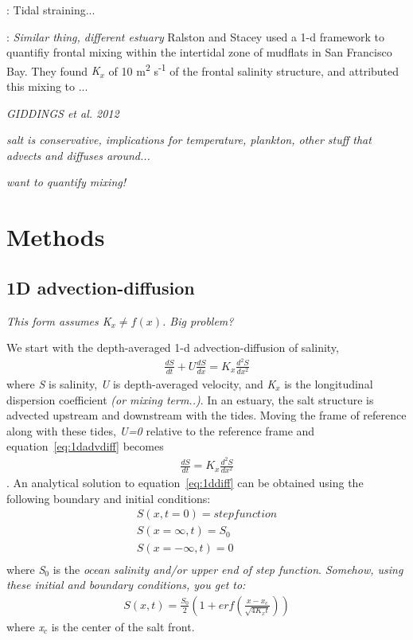 \parencite{Simpson:1990aa}: Tidal straining... 




\parencite{Ralston:2005aa}: \emph{Similar thing, different estuary}
Ralston and Stacey \cite{Ralston:2005aa} used a 1-d framework to quantifiy frontal mixing within the intertidal zone of mudflats in San Francisco Bay. They found \emph{K$_x$} of 10 m\textsuperscript{2} s\textsuperscript{-1} of the frontal salinity structure, and attributed this mixing to ...



\emph{GIDDINGS et al. 2012} 


\emph{salt is conservative, implications for temperature, plankton, other stuff that advects and diffuses around...}

\emph{want to quantify mixing!}


\section{Methods} \label{sec:ch4methods}

\subsection{1D advection-diffusion} \label{ssec:1dadvdif}

\emph{This form assumes K$_x \ne f(x)$. Big problem?}

We start with the depth-averaged 1-d advection-diffusion of salinity,
\begin{eqnarray}
\frac{dS}{dt} + U\frac{dS}{dx} = K_x\frac{d^2S}{dx^2} \label{eq:1dadvdiff}
\end{eqnarray}
where \emph{S} is salinity, \emph{U} is depth-averaged velocity, and \emph{K$_x$} is the longitudinal dispersion coefficient \emph{(or mixing term..)}. In an estuary, the salt structure is advected upstream and downstream with the tides. Moving the frame of reference along with these tides, \emph{U=0} relative to the reference frame and equation~\ref{eq:1dadvdiff} becomes
\begin{eqnarray}
\frac{dS}{dt} = K_x\frac{d^2S}{dx^2} \label{eq:1ddiff}
\end{eqnarray}
. An analytical solution to equation~\ref{eq:1ddiff} can be obtained using the following boundary and initial conditions:
\begin{eqnarray}
S(x,t=0) = step function\label{eq:1ddiffIC}\\
S(x=\infty,t) = S_0\label{eq:1ddiffBC1}\\
S(x=-\infty,t) = 0\label{eq:1ddiffBC2}\\
\end{eqnarray}
where \emph{S$_0$} is the \emph{ocean salinity and/or upper end of step function}. \emph{Somehow, using these initial and boundary conditions, you get to:}
\begin{eqnarray}
S(x,t) = \frac{S_0}{2}\left(1+erf\left(\frac{x-x_c}{\sqrt{4K_xt}}\right)\right) \label{eq:S}
\end{eqnarray}
where \emph{x$_c$} is the center of the salt front. 


